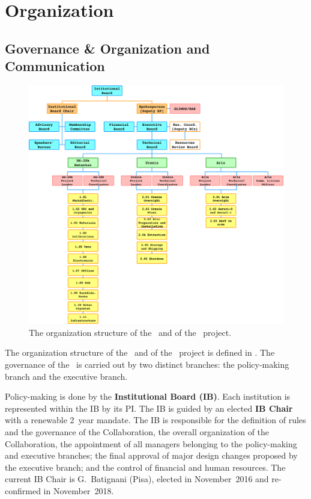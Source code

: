 \section{Organization}

\subsection{Governance \& Organization and Communication}

\begin{figure}[htbp!]
\includegraphics[width=\textwidth]{./Figures/ManagementChart.pdf}
\caption[The organization structure of the \GADMC\ and of the \DS\ project]{The organization structure of the \GADMC\ and of the \DS\ project.}
\label{fig:ManagementChart}
\end{figure}

The organization structure of the \GADMC\ and of the \DS\ project is defined in . The governance of the \GADMC\ is carried out by two distinct branches: the policy-making branch and the executive branch.

Policy-making is done by the {\bf Institutional Board (IB)}. Each institution is represented within the IB by its PI. The IB is guided by an elected {\bf IB Chair} with a renewable \num{2}~year mandate. The IB is responsible for the definition of rules and the governance of the Collaboration, the overall organization of the Collaboration, the appointment of all managers belonging to the policy-making and executive branches; the final approval of major design changes proposed by the executive branch; and the control of financial and human resources.  The current IB Chair is G.~Batignani (Pisa), elected in November~2016 and re-confirmed in November~2018.

